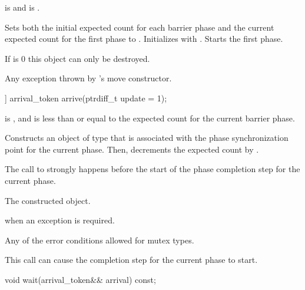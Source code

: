 \begin{itemdescr}
\pnum
\expects
{} is  and
 is .

\pnum
\effects
Sets both the initial expected count for each barrier phase and
the current expected count for the first phase to .
Initializes  with .
Starts the first phase.
\begin{note}
If  is 0 this object can only be destroyed.
\end{note}

\pnum
\throws
Any exception thrown by 's move constructor.
\end{itemdescr}

%
\begin{itemdecl}
[[nodiscard]] arrival_token arrive(ptrdiff_t update = 1);
\end{itemdecl}

\begin{itemdescr}
\pnum
\expects
{} is , and
 is less than or equal to
the expected count for the current barrier phase.

\pnum
\effects
Constructs an object of type 
that is associated with the phase synchronization point for the current phase.
Then, decrements the expected count by .

\pnum
\sync
The call to  strongly happens before
the start of the phase completion step for the current phase.

\pnum
\returns
The constructed  object.

\pnum
\throws
{} when an exception is required.

\pnum
\errors
Any of the error conditions
allowed for mutex types.

\pnum
\begin{note}
This call can cause the completion step for the current phase to start.
\end{note}
\end{itemdescr}

%
\begin{itemdecl}
void wait(arrival_token&& arrival) const;
\end{itemdecl}

